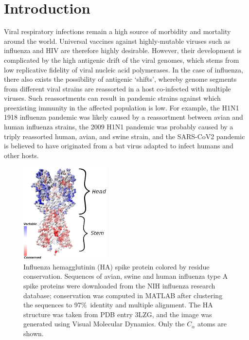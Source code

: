 \documentclass[utf8]{frontiersHLTH}%
\begin{document}
\section{Introduction}
\label{sec:introduction}
Viral respiratory infections remain a high source of morbidity and
mortality around the world. Universal vaccines against highly-mutable
viruses such as influenza and HIV are therefore highly desirable.
However, their development is complicated by the high antigenic drift of
the viral genomes, which stems from low replicative fidelity of viral
nucleic acid polymerases.  In the case of influenza, there also exists the possibility of antigenic `shifts',
whereby genome segments from different viral strains are
reassorted in a host co-infected with multiple viruses.
Such reassortments can result in pandemic strains against which preexisting immunity
in the affected population is low.
For example, the H1N1 1918 influenza pandemic was likely caused by a reassortment
between avian and human influenza strains, the 2009 H1N1 pandemic was probably
caused by a triply reassorted human, avian, and swine strain,\cite{taubenberger19} and the
SARS-CoV2 pandemic is believed to have originated from a bat virus adapted
to infect humans and other hosts.\cite{andersen20}

\begin{figure}
\centering
\includegraphics[width=0.4\textwidth]{cons3i.png}
\caption{
Influenza hemagglutinin (HA) spike protein colored by residue conservation. Sequences of avian, swine and human influenza type A 
spike proteins were downloaded from the NIH influenza research database\cite{bao08}; conservation was computed in MATLAB\cite{matlab} after
clustering the sequences to 97\%~identity and multiple alignment. The HA structure was taken from PDB entry 3LZG\cite{xu10}, and the image was generated
using Visual Molecular Dynamics.\cite{Humphrey96} Only the $C_\alpha$ atoms are shown.
}
\label{fig:cons}
\end{figure}
\end{document}
